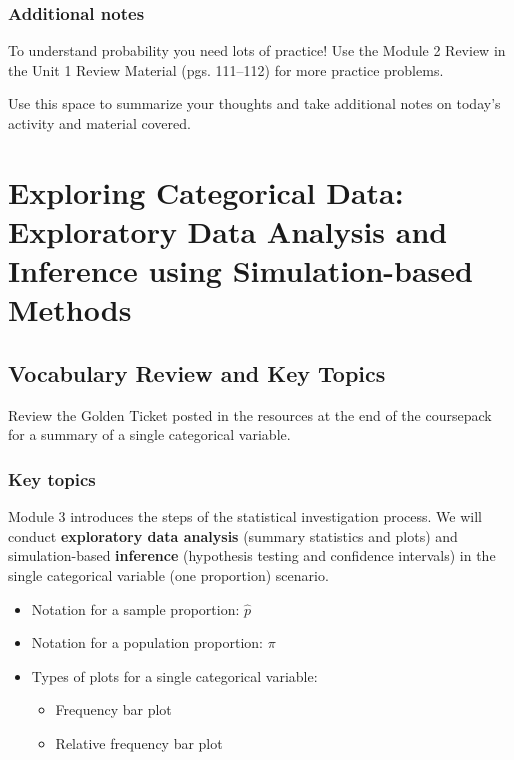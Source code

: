 \documentclass[
]{report}
\begin{document}
\subsection{Additional notes}\label{additional-notes-2}

To understand probability you need lots of practice! Use the Module 2 Review in the Unit 1 Review Material (pgs. 111--112) for more practice problems.

Use this space to summarize your thoughts and take additional notes on today's activity and material covered.

\newpage

\chapter{Exploring Categorical Data: Exploratory Data Analysis and Inference using Simulation-based Methods}\label{exploring-categorical-data-exploratory-data-analysis-and-inference-using-simulation-based-methods}

\section{Vocabulary Review and Key Topics}\label{vocabulary-review-and-key-topics-2}

Review the Golden Ticket posted in the resources at the end of the coursepack for a summary of a single categorical variable.

\subsection{Key topics}\label{key-topics-2}

Module 3 introduces the steps of the statistical investigation process. We will conduct \textbf{exploratory data analysis} (summary statistics and plots) and simulation-based \textbf{inference} (hypothesis testing and confidence intervals) in the single categorical variable (one proportion) scenario.

\begin{itemize}
\item
  Notation for a sample proportion: \(\hat{p}\)
\item
  Notation for a population proportion: \(\pi\)
\item
  Types of plots for a single categorical variable:

  \begin{itemize}
  \item
    Frequency bar plot
  \item
    Relative frequency bar plot
  \end{itemize}
\end{itemize}
\end{document}
